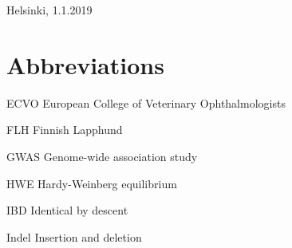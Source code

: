 \documentclass[12pt, a4paper, oneside]{article}
\begin{document}
\begin{FlushRight}
    Helsinki, 1.1.2019 \par
    \thesisauthor
\end{FlushRight}

\clearpage


\doublespacing

\tableofcontents

\clearpage

\listoffigures
\listoftables


\clearpage


\onehalfspacing

{}

\section*{Abbreviations} \label{sec:abbreviations}


\begin{abbreviations}
    \item [ECVO]         European College of Veterinary Ophthalmologists
    \item [FLH]          Finnish Lapphund
    \item [GWAS]         Genome-wide association study
    \item [HWE]          Hardy-Weinberg equilibrium
    \item [IBD]          Identical by descent
    \item [Indel]        Insertion and deletion
\end{abbreviations}
\end{document}

